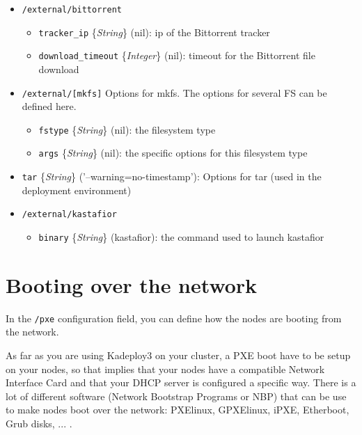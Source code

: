 \documentclass[a4wide,10pt,oneside]{book}
\newcommand{\ypath}[1]{\texttt{#1}}
\newcommand{\yfieldd}[3]{\texttt{#1} {\small\{{\emph{#2}}\}} {\small(}#3{\small)}:}
\begin{document}
\begin{itemize}
  \item \ypath{/external/bittorrent}
  \begin{itemize}
    \item \yfieldd{tracker\_ip}{String}{nil} ip of the Bittorrent tracker
    \item \yfieldd{download\_timeout}{Integer}{nil} timeout for the Bittorrent file download
  \end{itemize}

  \item \ypath{/external/[mkfs]} Options for mkfs. The options for several FS can be defined here.
  \begin{itemize}
    \item \yfieldd{fstype}{String}{nil} the filesystem type
    \item \yfieldd{args}{String}{nil} the specific options for this filesystem type
  \end{itemize}

  \item \yfieldd{tar}{String}{'--warning=no-timestamp'} Options for tar (used in the deployment environment)

  \item \ypath{/external/kastafior}
  \begin{itemize}
    \item \yfieldd{binary}{String}{kastafior} the command used to launch kastafior
  \end{itemize}
\end{itemize}

\section{Booting over the network}\label{sec:netboot}
In the \ypath{/pxe} configuration field, you can define how the nodes are booting from the network.

As far as you are using Kadeploy3 on your cluster, a PXE boot have to be setup on your nodes, so that implies that your nodes have a compatible Network Interface Card and that your DHCP server is configured a specific way. There is a lot of different software (Network Bootstrap Programs or NBP) that can be use to make  nodes boot over the network: PXElinux, GPXElinux, iPXE, Etherboot, Grub disks, ... .
\end{document}
